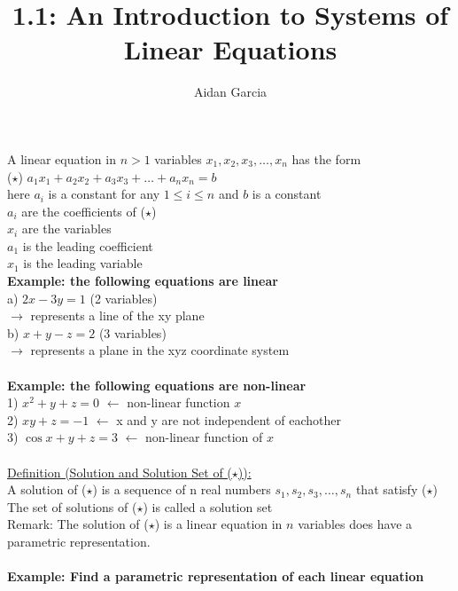 \documentclass{jhwhw}
\author{Aidan Garcia}
\title{1.1: An Introduction to Systems of Linear Equations}
\begin{document}
A linear equation in \(n>1\) variables \(x_1,x_2,x_3,\ldots,x_n\) has the form
\\
(\(\star\)) \(a_1 x_1 + a_2 x_2 + a_3 x_3 +\ldots+a_n x_n=b\)
\\

here \(a_i\) is a constant for any \(1 \leq i \leq n\) and \(b\) is a constant
\\

\(a_i\) are the coefficients of (\(\star\)) \\
\(x_i\) are the variables \\
\(a_1\) is the leading coefficient \\
\(x_1\) is the leading variable
\\

\textbf{Example: the following equations are linear}
\\
a) \(2x-3y=1\) (2 variables) \\
\(\rightarrow\) represents a line of the xy plane 
\\
b) \(x+y-z=2\) (3 variables) \\
\(\rightarrow\) represents a plane in the xyz coordinate system
\\ \\

\textbf{Example: the following equations are non-linear}
\\
1) \( \boxed{x^2} + y + z =0\) \(\leftarrow\) non-linear function \(x\)
\\
2) \(\boxed{xy} + z = -1\) \(\leftarrow\) x and y are not independent of eachother
\\
3) \(\boxed{\cos x} + y + z = 3\) \(\leftarrow\) non-linear function of \(x\)
\\ \\

\underline{Definition (Solution and Solution Set of (\(\star\))):}
\\

A solution of (\(\star\)) is a sequence of n real numbers  \(s_1, s_2, s_3,\ldots,s_n\) that satisfy  (\(\star\))
\\

The set of solutions of (\(\star\)) is called a solution set
\\

Remark: The solution of (\(\star\)) is a linear equation in \(n\) variables does have a parametric representation.
\\ \\

\textbf{Example: Find a parametric representation of each linear equation}
\\
\end{document}
